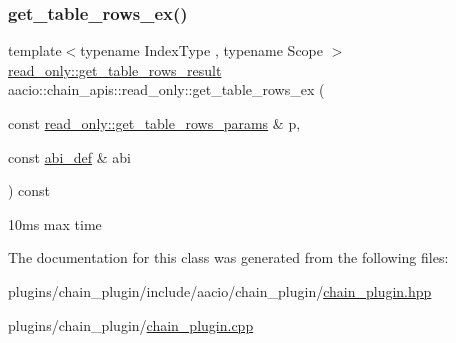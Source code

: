 \subsubsection{\texorpdfstring{get\+\_\+table\+\_\+rows\+\_\+ex()}{get\_table\_rows\_ex()}}
{\footnotesize\ttfamily template$<$typename Index\+Type , typename Scope $>$ \\
\mbox{\hyperlink{structaacio_1_1chain__apis_1_1read__only_1_1get__table__rows__result}{read\+\_\+only\+::get\+\_\+table\+\_\+rows\+\_\+result}} aacio\+::chain\+\_\+apis\+::read\+\_\+only\+::get\+\_\+table\+\_\+rows\+\_\+ex (\begin{DoxyParamCaption}\item[{const \mbox{\hyperlink{structaacio_1_1chain__apis_1_1read__only_1_1get__table__rows__params}{read\+\_\+only\+::get\+\_\+table\+\_\+rows\+\_\+params}} \&}]{p,  }\item[{const \mbox{\hyperlink{structaacio_1_1chain_1_1contracts_1_1abi__def}{abi\+\_\+def}} \&}]{abi }\end{DoxyParamCaption}) const\hspace{0.3cm}{\ttfamily [inline]}}

10ms max time 

The documentation for this class was generated from the following files\+:\begin{DoxyCompactItemize}
\item 
plugins/chain\+\_\+plugin/include/aacio/chain\+\_\+plugin/\mbox{\hyperlink{chain__plugin_8hpp}{chain\+\_\+plugin.\+hpp}}\item 
plugins/chain\+\_\+plugin/\mbox{\hyperlink{chain__plugin_8cpp}{chain\+\_\+plugin.\+cpp}}\end{DoxyCompactItemize}
